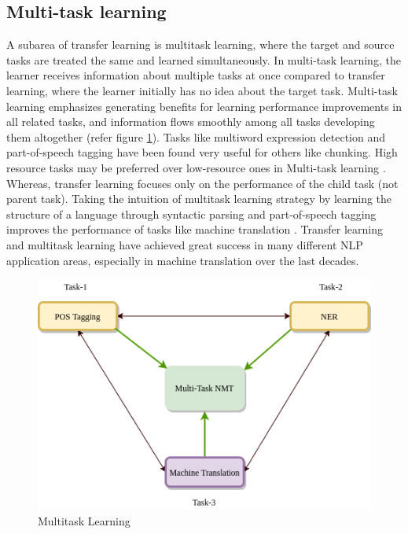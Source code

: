 \documentclass[manuscript,screen]{acmart}
\begin{document}
\subsection{Multi-task learning}
A subarea of transfer learning is multitask learning, where the target and source tasks are treated the same and learned simultaneously. In multi-task learning, the learner receives information about multiple tasks at once compared to transfer learning, where the learner initially has no idea about the target task. Multi-task learning emphasizes generating benefits for learning performance improvements in all related tasks, and information flows smoothly among all tasks developing them altogether (refer figure \ref{TLvsMTL}). Tasks like multiword expression detection and part-of-speech tagging have been found very useful for others like chunking. High resource tasks may be preferred over low-resource ones in Multi-task learning \citet{dou2019investigating}. Whereas, transfer learning focuses only on the performance of the child task (not parent task). Taking the intuition of multitask learning strategy by learning the structure of a language through syntactic parsing and part-of-speech tagging improves the performance of tasks like machine translation \citet{kiperwasser2018scheduled}. Transfer learning and multitask learning have achieved great success in many different NLP application areas, especially in machine translation over the last decades.

\begin{figure}[!h]
  \centering
  \includegraphics[width=0.5\linewidth]{nmtMultitask.png}
  \caption{Multitask Learning}
  \Description{}
  \label{TLvsMTL}
\end{figure}
\end{document}
